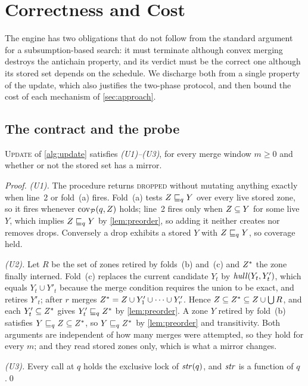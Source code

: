 \section{Correctness and Cost}\label{sec:correct}

The engine has two obligations that do not follow from the standard argument for
a subsumption-based search: it must terminate although convex merging destroys
the antichain property, and its verdict must be the correct one although its
stored set depends on the schedule.  We discharge both from a single property of
the update, which also justifies the two-phase protocol, and then bound the cost
of each mechanism of \cref{sec:approach}.

\subsection{The contract and the probe}

\begin{proposition}\label{prop:contract}
\textsc{Update} of \cref{alg:update} satisfies \emph{(U1)--(U3)}, for every
merge window $m \ge 0$ and whether or not the stored set has a mirror.
\end{proposition}
\begin{proof}
\emph{(U1).}  The procedure returns \textsc{dropped} without mutating anything
exactly when line~2 or fold~(a) fires.  Fold~(a) tests $Z \sqsubseteq_q Y$ over
every live stored zone, so it fires whenever $\mathrm{cov}_{\mathcal{P}}(q,Z)$
holds; line~2 fires only when $Z \subseteq Y$ for some live $Y$, which
implies $Z \sqsubseteq_q Y$ by \cref{lem:preorder}, so adding it neither creates
nor removes drops.  Conversely a drop exhibits a stored $Y$ with $Z \sqsubseteq_q
Y$, so coverage held.

\emph{(U2).}  Let $R$ be the set of zones retired by folds~(b) and~(c) and
$Z^{*}$ the zone finally interned.  Fold~(c) replaces the current candidate
$Y_t$ by $\mathit{hull}(Y_t,Y'_t)$, which equals $Y_t \cup Y'_t$ because the merge
condition requires the union to be exact, and retires $Y'_t$; after $r$ merges
$Z^{*} = Z \cup Y'_1 \cup \dots \cup Y'_r$.  Hence $Z \subseteq
Z^{*} \subseteq Z \cup \bigcup R$, and each $Y'_t \subseteq Z^{*}$
gives $Y'_t \sqsubseteq_q Z^{*}$ by \cref{lem:preorder}.  A zone $Y$ retired by
fold~(b) satisfies $Y \sqsubseteq_q Z \subseteq Z^{*}$, so $Y \sqsubseteq_q
Z^{*}$ by \cref{lem:preorder} and transitivity.  Both arguments are
independent of how many merges were attempted, so they hold for every $m$; and
they read stored zones only, which is what a mirror changes.

\emph{(U3).}  Every call at $q$ holds the exclusive lock of $\mathit{str}(q)$, and
$\mathit{str}$ is a function of $q$.\qed
\end{proof}

